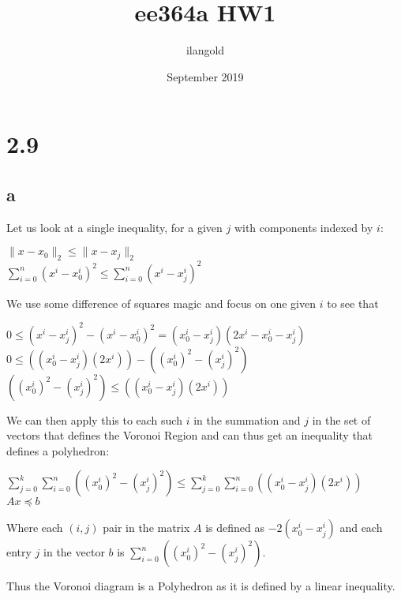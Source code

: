 \documentclass{article}
\title{ee364a HW1}
\author{ilangold }
\date{September 2019}
\begin{document}
\maketitle

\section*{2.9}

\subsection*{a}
Let us look at a single inequality, for a given $j$ with components indexed  by $i$:
\begin{center}
    $\|x - x_0\|_2 \leq \|x - x_j\|_2 $ \\
    \vspace{2mm}
    $ \sum_{i=0}^{n}(x^i - x^i_0)^2 \leq \sum_{i=0}^{n}(x^i - x^i_j)^2$
\end{center}
We use some difference of squares magic and focus on one given $i$ to see that 
\begin{center}
    $0 \leq (x^i - x^i_j)^2 - (x^i - x^i_0)^2 = (x_0^i - x_j^i)(2x^i - x_0^i - x_j^i)$ \\
    \vspace{2mm}
    $0 \leq ((x_0^i - x_j^i)(2x^i)) - ((x_0^i)^2 - (x_j^i)^2)$ \\
    \vspace{2mm}
    $((x_0^i)^2 - (x_j^i)^2) \leq ((x_0^i - x_j^i)(2x^i))$
\end{center}
We can then apply this to each such $i$ in the summation and $j$ in the set of vectors that defines the Voronoi Region and can thus get an inequality that defines a polyhedron:
\begin{center}
    $\sum_{j=0}^{k} \sum_{i=0}^{n} ((x_0^i)^2 - (x_j^i)^2) \leq \sum_{j=0}^{k} \sum_{i=0}^{n} ((x_0^i - x_j^i)(2x^i))$ \\ 
    \vspace{2mm}
    $A x  \preceq b$
\end{center}
Where each $(i,j)$ pair in the matrix $A$ is defined as $-2(x_0^i - x_j^i)$ and each entry $j$ in the vector $b$ is $\sum_{i=0}^{n} ((x_0^i)^2 - (x_j^i)^2)$.

Thus the Voronoi diagram is a Polyhedron as it is defined by a linear inequality.
\end{document}
